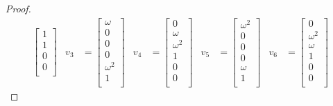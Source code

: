 \documentclass[../psets.tex]{subfiles}
\begin{document}
\begin{enumerate}
\begin{enumerate}
\begin{proof}
\begin{align*}
\begin{bmatrix}
                    1\\
                    1\\
                    0\\
                    0\\
                \end{bmatrix}&
                v_3 &=
                \begin{bmatrix}
                    \omega\\
                    0\\
                    0\\
                    0\\
                    \omega^2\\
                    1\\
                \end{bmatrix}&
                v_4 &=
                \begin{bmatrix}
                    0\\
                    \omega\\
                    \omega^2\\
                    1\\
                    0\\
                    0\\
                \end{bmatrix}&
                v_5 &=
                \begin{bmatrix}
                    \omega^2\\
                    0\\
                    0\\
                    0\\
                    \omega\\
                    1\\
                \end{bmatrix}&
                v_6 &=
                \begin{bmatrix}
                    0\\
                    \omega^2\\
                    \omega\\
                    1\\
                    0\\
                    0\\
                \end{bmatrix}
            \end{align*}

\end{proof}
\end{enumerate}
\end{enumerate}
\end{document}
